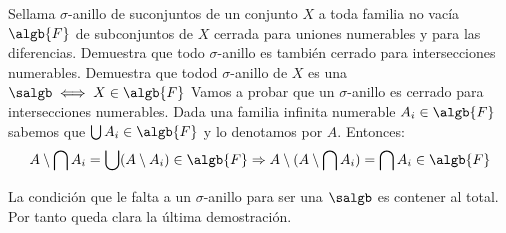 \begin{problem}[12]
Sellama $\sigma$-anillo de suconjuntos de un conjunto $X$ a toda familia no vacía $\algb{F}$ de subconjuntos de $X$ cerrada para uniones numerables y para las diferencias. Demuestra que todo $\sigma$-anillo es también cerrado para intersecciones numerables. Demuestra que todod $\sigma$-anillo de $X$ es una $\salgb \iff X \in \algb{F}$
\solution
Vamos a probar que un $\sigma$-anillo es cerrado para intersecciones numerables.
Dada una familia infinita numerable $A_i \in \algb{F}$ sabemos que $\bigcup A_i \in \algb{F}$ y lo denotamos por $A$.
Entonces:
\[A \setminus \bigcap A_i = \bigcup(A\setminus A_i) \in \algb{F} \Rightarrow A\setminus (A \setminus \bigcap A_i)=\bigcap A_i \in \algb{F}\]

La condición que le falta a un $\sigma$-anillo para ser una $\salgb$ es contener al total. Por tanto queda clara la última demostración.
\end{problem}

